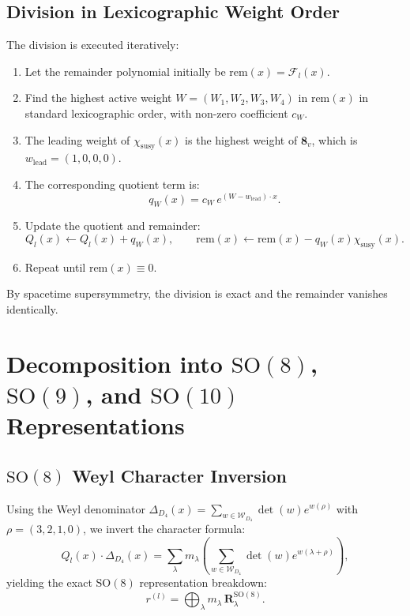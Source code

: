 \documentclass[11pt,a4paper]{article}
\begin{document}
\subsection{Division in Lexicographic Weight Order}
The division is executed iteratively:
\begin{enumerate}
    \item Let the remainder polynomial initially be $\text{rem}(x) = \mathcal{F}_l(x)$.
    \item Find the highest active weight $W = (W_1, W_2, W_3, W_4)$ in $\text{rem}(x)$ in standard lexicographic order, with non-zero coefficient $c_W$.
    \item The leading weight of $\chi_{\text{susy}}(x)$ is the highest weight of $\mathbf{8}_v$, which is $w_{\text{lead}} = (1, 0, 0, 0)$.
    \item The corresponding quotient term is:
    \begin{equation}
        q_W(x) = c_W \, e^{(W - w_{\text{lead}}) \cdot x}.
    \end{equation}
    \item Update the quotient and remainder:
    \begin{equation}
        Q_l(x) \leftarrow Q_l(x) + q_W(x), \qquad \text{rem}(x) \leftarrow \text{rem}(x) - q_W(x) \chi_{\text{susy}}(x).
    \end{equation}
    \item Repeat until $\text{rem}(x) \equiv 0$.
\end{enumerate}
By spacetime supersymmetry, the division is exact and the remainder vanishes identically.

\section{Decomposition into $\mathrm{SO}(8)$, $\mathrm{SO}(9)$, and $\mathrm{SO}(10)$ Representations}

\subsection{$\mathrm{SO}(8)$ Weyl Character Inversion}
Using the Weyl denominator $\Delta_{D_4}(x) = \sum_{w \in \mathcal{W}_{D_4}} \det(w) e^{w(\rho)}$ with $\rho = (3, 2, 1, 0)$, we invert the character formula:
\begin{equation}
    Q_l(x) \cdot \Delta_{D_4}(x) = \sum_{\lambda} m_\lambda \left( \sum_{w \in \mathcal{W}_{D_4}} \det(w) e^{w(\lambda + \rho)} \right),
\end{equation}
yielding the exact $\mathrm{SO}(8)$ representation breakdown:
\begin{equation}
    r^{(l)} = \bigoplus_\lambda m_\lambda \, \mathbf{R}_\lambda^{\mathrm{SO}(8)}.
\end{equation}
\end{document}
